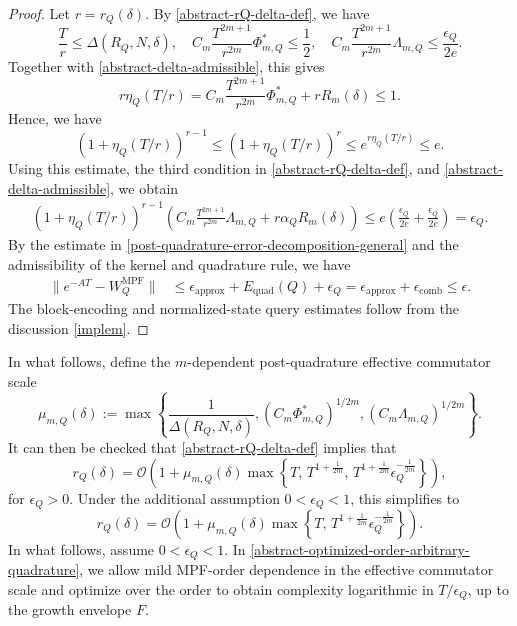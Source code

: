 \documentclass[10pt,reqno]{article}
\numberwithin{equation}{section}
\theoremstyle{plain}
\theoremstyle{definition}
\begin{document}
\begin{proof}
Let \(r=r_Q(\delta)\). By \cref{abstract-rQ-delta-def}, we have
\begin{equation}
\frac{T}{r}\le \Delta(R_Q,N,\delta), \quad C_m\frac{T^{2m+1}}{r^{2m}}\Phi_{m,Q}^{\ast} \le \frac12, \quad C_m\frac{T^{2m+1}}{r^{2m}}\Lambda_{m,Q} \le \frac{\epsilon_Q}{2e}.
\end{equation}
Together with \cref{abstract-delta-admissible}, this gives
\begin{equation}
r\eta_Q(T/r) = C_m\frac{T^{2m+1}}{r^{2m}}\Phi_{m,Q}^{\ast} + rR_m(\delta) \le 1.
\end{equation}
Hence, we have
\begin{equation}
(1+\eta_Q(T/r))^{r-1} \le (1+\eta_Q(T/r))^r \le e^{r\eta_Q(T/r)} \le e.
\end{equation}
Using this estimate, the third condition in \cref{abstract-rQ-delta-def}, and \cref{abstract-delta-admissible}, we obtain
\begin{align}(1+\eta_Q(T/r))^{r-1} \left( C_m\frac{T^{2m+1}}{r^{2m}}\Lambda_{m,Q} + r\alpha_QR_m(\delta) \right) \le e\left( \frac{\epsilon_Q}{2e}+\frac{\epsilon_Q}{2e} \right) = \epsilon_Q.
\end{align}
By the estimate in \cref{post-quadrature-error-decomposition-general} and the admissibility of the kernel and quadrature rule, we have
\begin{align}
\|e^{-AT}-W_Q^{\operatorname{MPF}}\| &\le \epsilon_{\operatorname{approx}} + E_{\operatorname{quad}}(Q) + \epsilon_Q = \epsilon_{\operatorname{approx}} +\epsilon_{\operatorname{comb}} \le \epsilon.
\end{align}
The block-encoding and normalized-state query estimates follow from the discussion \cref{implem}.
\end{proof}

In what follows, define the \(m\)-dependent post-quadrature effective commutator scale
\begin{equation}\label{abstract-mu-mQ-def}
\mu_{m,Q}(\delta) := \max\left\{ \frac{1}{\Delta(R_Q,N,\delta)}, (C_m\Phi_{m,Q}^{\ast})^{1/2m}, \left(C_m\Lambda_{m,Q}\right)^{1/2m} \right\}.
\end{equation}
It can then be checked that \cref{abstract-rQ-delta-def} implies that
\begin{equation}\label{abstract-rQ-mu-bound}
r_Q(\delta) = \mathcal O\left( 1+ \mu_{m,Q}(\delta) \max\left\{ T,\, T^{1+\frac1{2m}},\, T^{1+\frac1{2m}}\epsilon_Q^{-\frac1{2m}} \right\} \right),
\end{equation}
for $\epsilon_Q > 0$. Under the additional assumption \(0<\epsilon_Q<1\), this simplifies to
\begin{equation}\label{abstract-rQ-mu-bound-simple}
r_Q(\delta) = \mathcal O\left( 1+ \mu_{m,Q}(\delta) \max\left\{ T,\, T^{1+\frac1{2m}}\epsilon_Q^{-\frac1{2m}} \right\} \right).
\end{equation}
In what follows, assume \(0<\epsilon_Q<1\). In \cref{abstract-optimized-order-arbitrary-quadrature}, we allow mild MPF-order dependence in the effective commutator scale and optimize over the order to obtain complexity logarithmic in \(T/\epsilon_Q\), up to the growth envelope \(F\).
\end{document}
